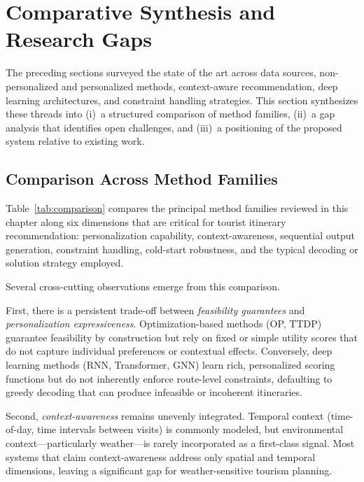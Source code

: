\section{Comparative Synthesis and Research Gaps}
\label{sec:sota-synthesis}

The preceding sections surveyed the state of the art across data sources, non-personalized and personalized methods, context-aware recommendation, deep learning architectures, and constraint handling strategies. This section synthesizes these threads into (i)~a structured comparison of method families, (ii)~a gap analysis that identifies open challenges, and (iii)~a positioning of the proposed system relative to existing work.

\subsection{Comparison Across Method Families}
\label{sec:sota-synth-comparison}

Table~\ref{tab:comparison} compares the principal method families reviewed in this chapter along six dimensions that are critical for tourist itinerary recommendation: personalization capability, context-awareness, sequential output generation, constraint handling, cold-start robustness, and the typical decoding or solution strategy employed.



Several cross-cutting observations emerge from this comparison.

First, there is a persistent trade-off between \emph{feasibility guarantees} and \emph{personalization expressiveness}. Optimization-based methods (OP, TTDP) guarantee feasibility by construction but rely on fixed or simple utility scores that do not capture individual preferences or contextual effects. Conversely, deep learning methods (RNN, Transformer, GNN) learn rich, personalized scoring functions but do not inherently enforce route-level constraints, defaulting to greedy decoding that can produce infeasible or incoherent itineraries.

Second, \emph{context-awareness} remains unevenly integrated. Temporal context (time-of-day, time intervals between visits) is commonly modeled, but environmental context---particularly weather---is rarely incorporated as a first-class signal. Most systems that claim context-awareness address only spatial and temporal dimensions, leaving a significant gap for weather-sensitive tourism planning.

